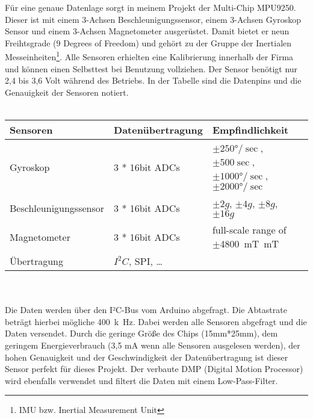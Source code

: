 Für eine genaue Datenlage sorgt in meinem Projekt der Multi-Chip MPU9250. Dieser ist mit 
einem 3-Achsen Beschleunigungssensor, einem 3-Achsen Gyroskop Sensor und einem 3-Achsen 
Magnetometer ausgerüstet. Damit bietet er neun Freihtsgrade (9 Degrees of Freedom) und gehört zu der Gruppe der 
Inertialen Messeinheiten\footnote{IMU bzw. Inertial Measurement Unit}.
Alle Sensoren erhielten eine Kalibrierung innerhalb der 
Firma und können einen Selbsttest bei Benutzung vollziehen. Der Sensor benötigt nur 2,4 bis 3,6 Volt während 
des Betriebs. In der Tabelle sind die Datenpins und die Genauigkeit der Sensoren notiert.\\
\\
\begin{tabularx}{0.8\textwidth}{l|X|XX}
Sensoren & Datenübertragung & Empfindlichkeit                                     \\
\hline
Gyroskop & 3 * 16bit ADCs & $\pm250°/\sec$, $\pm500\sec$, $\pm1000°/\sec$, $\pm2000°/\sec$\\ 
\hline
Beschleunigungssensor & 3 * 16bit ADCs & $\pm2g$, $\pm4g$, $\pm8g$, $\pm16g$\\
\hline
Magnetometer & 3 * 16bit ADCs & full-scale range of $\pm$\SI{4800}{\milli\tesla\meter}T \\
\hline
Übertragung & $I^2C$, SPI, \dots & \\
\end{tabularx}
\\
\\
Die Daten werden über den I²C-Bus vom Arduino abgefragt. Die Abtastrate beträgt hierbei 
mögliche \si{400 k\hertz}. Dabei werden alle Sensoren abgefragt und die Daten versendet.
Durch die geringe Größe des Chips (15mm*25mm), dem geringem Energieverbrauch (3,5 mA wenn 
alle Sensoren ausgelesen werden), der hohen Genauigkeit und der Geschwindigkeit der 
Datenübertragung ist dieser Sensor perfekt für dieses Projekt. Der verbaute
DMP (Digital Motion Processor) wird ebenfalls verwendet und filtert die Daten mit einem
Low-Pass-Filter.

